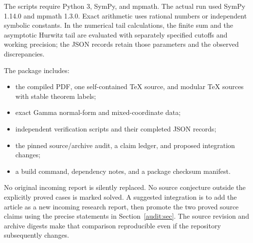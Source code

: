 The scripts require Python 3, SymPy, and mpmath.  The actual run used
SymPy 1.14.0 and mpmath 1.3.0.  Exact arithmetic uses rational numbers
or independent symbolic constants.  In the numerical tail calculations,
the finite sum and the asymptotic Hurwitz tail are evaluated with
separately specified cutoffs and working precision; the JSON records
retain those parameters and the observed discrepancies.

The package includes:
\begin{itemize}
\item the compiled PDF, one self-contained TeX source, and modular
TeX sources with stable theorem labels;
\item exact Gamma normal-form and mixed-coordinate data;
\item independent verification scripts and their completed JSON records;
\item the pinned source/archive audit, a claim ledger, and proposed
integration changes;
\item a build command, dependency notes, and a package checksum manifest.
\end{itemize}

No original incoming report is silently replaced.  No source conjecture
outside the explicitly proved cases is marked solved.  A suggested
integration is to add the article as a new incoming research report,
then promote the two proved source claims using the precise statements
in Section~\ref{audit:sec}.  The source revision and archive digests
make that comparison reproducible even if the repository subsequently
changes.
